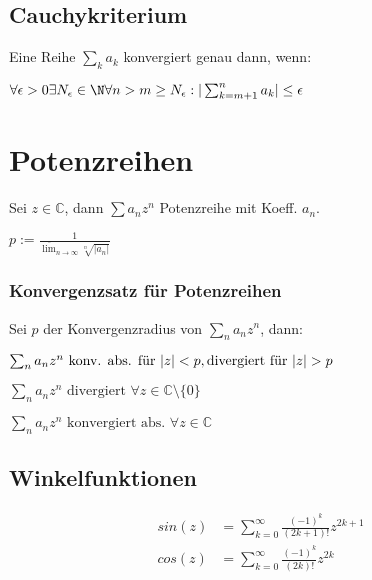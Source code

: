 \subsection*{Cauchykriterium}

Eine Reihe $\sum_k a_k$ konvergiert genau dann, wenn:

$\forall \epsilon > 0 \exists N_\epsilon \in \N \forall n > m \geq N_\epsilon : | \sum_{k=m+1}^{n} a_k | \leq \epsilon$

\section*{Potenzreihen}

Sei $z \in \mathbb{C}$, dann $\sum a_n z^n$ Potenzreihe mit Koeff. $a_n$.

\begin{description}[leftmargin=!]
	\item[Konvergenzradius] $p := \frac{1}{\overline\lim_{n \to \infty} \sqrt[n]{|a_n|}}$
\end{description}

\subsubsection*{Konvergenzsatz für Potenzreihen}

Sei $p$ der Konvergenzradius von $\sum_n a_n z^n$, dann:

\begin{description}[leftmargin=!,labelwidth=15mm]
	\item[$p \in (0, \infty)$] $\sum_n a_n z^n \text{ konv. abs. für } |z| < p, \\ \text{divergiert für } |z| > p$
	\item[$p=0$] $\sum_n a_n z^n \text{ divergiert } \forall z \in \mathbb{C}\setminus \{0\}$
	\item[$p=\infty$] $\sum_n a_n z^n \text{ konvergiert abs. } \forall z \in \mathbb{C}$
\end{description}

\subsection*{Winkelfunktionen}

\vspace*{-3mm}
\begin{align*}
	sin(z) &= \textstyle\sum_{k=0}^\infty \frac{(-1)^k}{(2k+1)!} z^{2k+1} \\
	cos(z) &= \textstyle\sum_{k=0}^\infty \frac{(-1)^k}{(2k)!} z^{2k}
\end{align*}

